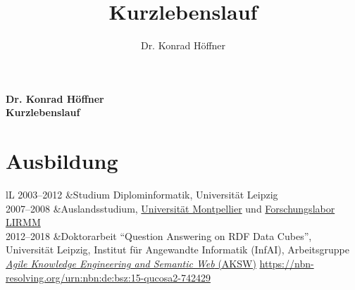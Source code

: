 \documentclass[a4paper,11pt]{article}
\title{Kurzlebenslauf}
\author{Dr. Konrad Höffner}
\begin{document}
\newcommand{\citep}{}
\newcommand{\citet}{}

{\huge\raggedright\noindent
\textbf{%
Dr. Konrad Höffner\\
\vspace{0.5em}
Kurzlebenslauf
}
}

\thispagestyle{empty}%

\section*{Ausbildung}
\begin{tabulary}{\textwidth}{lL}
2003--2012		&Studium Diplominformatik, Universität Leipzig\\%
2007--2008		&Auslandsstudium, \href{http://www.umontpellier.fr/}{Universität Montpellier} und \href{http://www.lirmm.fr/}{Forschungslabor LIRMM}\\
2012--2018  	&Doktorarbeit \enquote{Question Answering on RDF Data Cubes},\newline
							Universität Leipzig, Institut für Angewandte Informatik (InfAI),\newline
							Arbeitsgruppe \href{http://aksw.org}{\emph{Agile Knowledge Engineering and Semantic Web} (AKSW)}\newline
							\url{https://nbn-resolving.org/urn:nbn:de:bsz:15-qucosa2-742429}\\
\end{tabulary}
\end{document}
